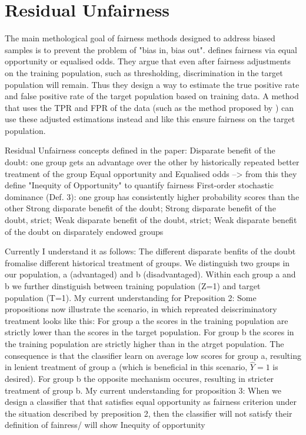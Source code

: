 \section{Residual Unfairness}
The main methological goal of fairness methods designed to address biased samples is to prevent the problem of "bias in, bias out".
\cite{kallus} defines fairness via equal opportunity or equalised odds. They argue that even after fairness adjustments on the training population, such as thresholding, discrimination in the target population will remain.
Thus they design a way to estimate the true positive rate and false positive rate of the target population based on training data. A method that uses the TPR and FPR of the data (such as the method proposed by \cite{hardt2016}) can use these adjusted estimations instead and like this ensure fairness on the target population.


Residual Unfairness \cite{kallus} concepts defined in the paper:
Disparate benefit of the doubt: one group gets an advantage over the other by historically repeated better treatment of the group
Equal opportunity and Equalised odds --> from this they define "Inequity of Opportunity" to quantify fairness
First-order stochastic dominance (Def. 3): one group has consistently higher probability scores than the other
Strong disparate benefit of the doubt; Strong disparate benefit of the doubt,  strict;
Weak disparate benefit of the doubt, strict; Weak disparate benefit of the doubt on disparately endowed groups

Currently I understand it as follows:
The different disparate benfits of the doubt fromalise different historical treatment of groups.
We distinguish two groups in our population, a (advantaged) and b (disadvantaged). Within each group a and b we further dinstiguish between training population (Z=1) and target population (T=1).
My current understanding for Preposition 2: Some propositions now illustrate the scenario, in which repreated deiscriminatory treatment looks like this: For group a the scores in the training population are strictly lower than the scores in the target population. For group b the scores in the training population are strictly higher than in the atrget population. The consequence is that the classifier learn on average low scores for group a, resulting in lenient treatment of group a (which is beneficial in this scenario, $\hat{Y} = 1$ is desired). For group b the opposite mechanism occures, resulting in stricter treatment of group b.
My current understanding for proposition 3: When we design a classifier that that satisfies equal opportunity as fairness criterion under the situation described by preposition 2, then the classifier will not satisfy their definition of fainress/ will show Inequity of opportunity

